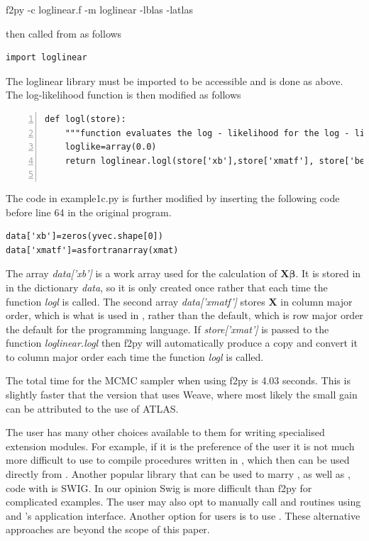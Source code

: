 \documentclass[article]{jss}
\begin{document}
f2py -c loglinear.f -m loglinear -lblas -latlas

then called from  as follows


\begin{lstlisting}[basicstyle={\scriptsize}]
import loglinear
\end{lstlisting}


The loglinear library must be imported to be accessible and is done as
above. The log-likelihood function is then modified as follows


\begin{lstlisting}[basicstyle={\scriptsize},numbers=left]
def logl(store):
	"""function evaluates the log - likelihood for the log - linear model"""
	loglike=array(0.0)     
	return loglinear.logl(store['xb'],store['xmatf'], store['beta'],store['yvec'],loglike)
    
\end{lstlisting}


The code in example1c.py is further modified by inserting the
following code before line 64 in the original program.


\begin{lstlisting}[basicstyle={\scriptsize}]
data['xb']=zeros(yvec.shape[0])
data['xmatf']=asfortranarray(xmat)
\end{lstlisting}


The array \emph{data{[}'xb'{]}} is a work array used for the
calculation of $\bm{X}\bm{\beta}.$ It is stored in in the
 dictionary \emph{data}, so it is only created once
rather that each time the function \emph{logl} is called. The second
array \emph{data{[}'xmatf'{]}} stores $\bm{X}$ in column major order,
which is what is used in , rather than the
 default, which is row major order the default for
the  programming language. If \emph{store{[}'xmat'{]}} is
passed to the function \emph{loglinear.logl} then f2py will
automatically produce a copy and convert it to column major order each
time the function \emph{logl} is called.

The total time for the MCMC sampler when using f2py is 4.03 seconds.
This is slightly faster that the version that uses Weave, where most
likely the small gain can be attributed to the use of ATLAS.

The user has many other choices available to them for writing
specialised extension modules. For example, if it is the preference of
the user it is not much more difficult to use  to compile
procedures written in , which then can be used directly
from . Another popular library that can be used to
marry , as well as , code with
 is SWIG. In our opinion Swig is more difficult than
f2py for complicated examples. The user may also opt to manually call
 and  routines using  and
's  application interface. Another option for
 users is to use  . These
alternative approaches are beyond the scope of this paper.
\end{document}
